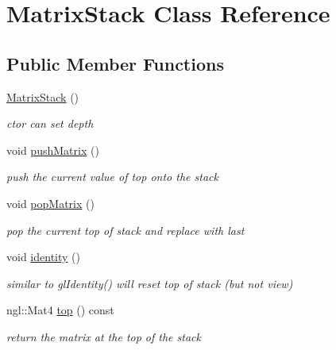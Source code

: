 \hypertarget{class_matrix_stack}{}\section{Matrix\+Stack Class Reference}
\label{class_matrix_stack}
\subsection*{Public Member Functions}
\begin{DoxyCompactItemize}
\item 
\hyperlink{class_matrix_stack_a3244319384a8d7af077670f69d8d9e6e}{Matrix\+Stack} ()
\begin{DoxyCompactList}\small\item\em ctor can set depth \end{DoxyCompactList}\item 
\mbox{\label{class_matrix_stack_a8dc92deca8176112d54ed36427396134}} 
void \hyperlink{class_matrix_stack_a8dc92deca8176112d54ed36427396134}{push\+Matrix} ()
\begin{DoxyCompactList}\small\item\em push the current value of top onto the stack \end{DoxyCompactList}\item 
\mbox{\label{class_matrix_stack_ae65f661d4e59e973443b640e6a99c665}} 
void \hyperlink{class_matrix_stack_ae65f661d4e59e973443b640e6a99c665}{pop\+Matrix} ()
\begin{DoxyCompactList}\small\item\em pop the current top of stack and replace with last \end{DoxyCompactList}\item 
\mbox{\label{class_matrix_stack_ac4e12970dc545ebd05d92c1347e11714}} 
void \hyperlink{class_matrix_stack_ac4e12970dc545ebd05d92c1347e11714}{identity} ()
\begin{DoxyCompactList}\small\item\em similar to gl\+Identity() will reset top of stack (but not view) \end{DoxyCompactList}\item 
ngl\+::\+Mat4 \hyperlink{class_matrix_stack_ac1499f970a31ed52adc284143f5d6c72}{top} () const
\begin{DoxyCompactList}\small\item\em return the matrix at the top of the stack \end{DoxyCompactList}\item 

\end{DoxyCompactItemize}
